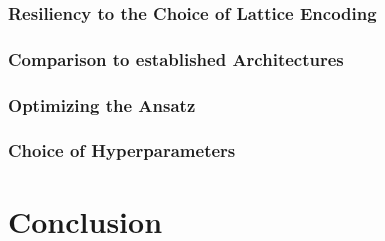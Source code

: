 \documentclass[
headings=optiontohead,              %
12pt,                               %
DIV=13,                             %
twoside=false,                      %
open=right,                         %
BCOR=10mm,                          %
toc=bibliographynumbered            %
]{scrreport}
\begin{document}
        \subsection{Resiliency to the Choice of Lattice Encoding}
        \subsection{Comparison to established Architectures}
        \subsection{Optimizing the Ansatz}
        \subsection{Choice of Hyperparameters}

\chapter{Conclusion}



\end{document}
